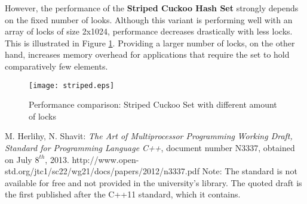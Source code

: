 \documentclass[a4paper,10pt]{article}
\begin{document}
However, the performance of the \textbf{Striped Cuckoo Hash Set} strongly depends on the fixed number of looks. Although this variant is performing well with an array of locks of size 2x1024, performance decreases drastically with less locks. This is illustrated in Figure \ref{fig:plot3}. Providing a larger number of locks, on the other hand, increases memory overhead for applications that require the set to hold comparatively few elements.

\begin{figure}[H]
\begin{center}
\texttt{[image: striped.eps]}
\end{center}
\caption{Performance comparison: Striped Cuckoo Set with different amount of locks}
\label{fig:plot3}
\end{figure}


\begin{thebibliography}{9}
    M. Herlihy, N. Shavit:
   \emph{The Art of Multiprocessor Programming}
	\emph{Working Draft, Standard for Programming Language C++},
	document number N3337, obtained on July $8^{th}$, 2013.	
	http://www.open-std.org/jtc1/sc22/wg21/docs/papers/2012/n3337.pdf
	\newline
	Note: The standard is not available for free and not provided in the university's  library. The quoted draft is the first published after the C++11 standard, which it contains.

\end{thebibliography}
\end{document}
